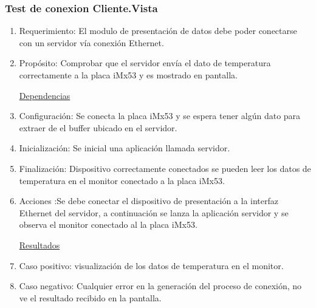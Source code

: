  \subsubsection{\textcolor[gray]{.2}{Test de conexion Cliente.Vista }}
\begin{enumerate}
\item Requerimiento: El modulo de presentación de datos debe poder conectarse con un servidor vía conexión Ethernet.
\item Propósito: Comprobar que el servidor envía el dato de temperatura correctamente a la placa iMx53 y es mostrado en pantalla.

\underline{\textcolor[gray]{.8}{Dependencias}}

\item Configuración: Se conecta la placa iMx53 y se espera tener algún dato para extraer de el  buffer ubicado en el servidor.
\item Inicialización: Se inicial una aplicación llamada servidor.
\item Finalización: Dispositivo correctamente conectados se pueden leer los datos de temperatura en el monitor conectado a la placa iMx53.   
\item Acciones :Se debe conectar el dispositivo de presentación a la interfaz Ethernet del servidor, a continuación se lanza la aplicación servidor y se observa el monitor conectado al la placa iMx53.

\underline{\textcolor[gray]{.8}{Resultados}} 

\item Caso positivo: visualización de los datos de temperatura en el monitor.
\item Caso negativo: Cualquier error en la generación del proceso de conexión, no ve el resultado recibido en la pantalla.

\end{enumerate}








